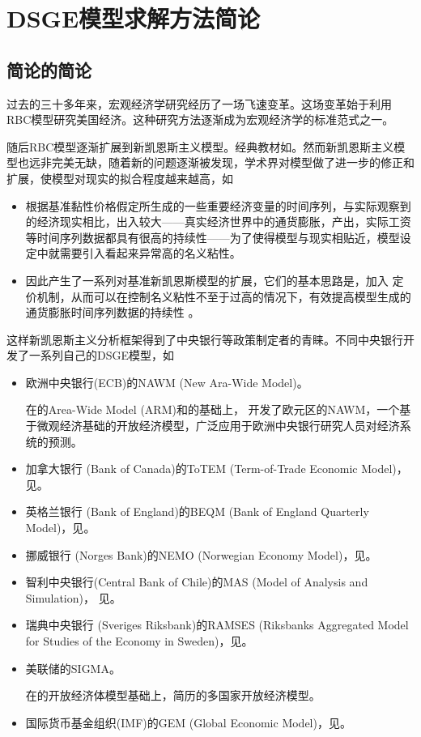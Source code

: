 \chapter{DSGE模型求解方法简论}
\label{sec:solution-strat}


\section{简论的简论}
过去的三十多年来，宏观经济学研究经历了一场飞速变革。这场变革始于\cite{Kydland:1982cd}利用RBC模型研究美国经济。这种研究方法逐渐成为宏观经济学的标准范式之一\citep{An:2007cv, FernandezVillaverde:2010fq}。

随后RBC模型逐渐扩展到新凯恩斯主义模型。经典教材如\cite{Gali:2005gp,Woodford:2011ks}。然而新凯恩斯主义模型也远非完美无缺，随着新的问题逐渐被发现，学术界对模型做了进一步的修正和扩展，使模型对现实的拟合程度越来越高，如
\begin{itemize}
  \item 根据基准黏性价格假定所生成的一些重要经济变量的时间序列，与实际观察到的经济现实相比，出入较大——真实经济世界中的通货膨胀，产出，实际工资等时间序列数据都具有很高的持续性——为了使得模型与现实相贴近，模型设定中就需要引入看起来异常高的名义粘性。
  \item 因此产生了一系列对基准新凯恩斯模型的扩展，它们的基本思路是，加入\cite{Calvo:1983uq} 定价机制，从而可以在控制名义粘性不至于过高的情况下，有效提高模型生成的通货膨胀时间序列数据的持续性 \citep{Rabanal:2005ii}。
\end{itemize}

这样新凯恩斯主义分析框架得到了中央银行等政策制定者的青睐。不同中央银行开发了一系列自己的DSGE模型，如
\begin{itemize}
  \item 欧洲中央银行(ECB)的NAWM (New Ara-Wide Model)。

  在\cite{Fagan:2005hv}的Area-Wide Model (ARM)和\cite{Smets:2003ic}的基础上，\cite{Christoffel:2008vq} 开发了欧元区的NAWM，一个基于微观经济基础的开放经济模型，广泛应用于欧洲中央银行研究人员对经济系统的预测。
  \item 加拿大银行 (Bank of Canada)的ToTEM (Term-of-Trade Economic Model)，见\cite{Murchison:2006wc}。
  \item 英格兰银行 (Bank of England)的BEQM (Bank of England Quarterly Model)，见\cite{Harrison:2005tc}。
  \item 挪威银行 (Norges Bank)的NEMO (Norwegian Economy Model)，见\cite{Brubakk:2006vu}。
  \item 智利中央银行(Central Bank of Chile)的MAS (Model of Analysis and Simulation)， 见\cite{Medina:2007tz}。
  \item 瑞典中央银行 (Sveriges Riksbank)的RAMSES (Riksbanks Aggregated Model for Studies of the Economy in Sweden)，见\cite{Adolfson:2007bv,Adolfson:2008cs}。
  \item 美联储的SIGMA。

  在\cite{Obstfeld:1995jp}的开放经济体模型基础上，\cite{Erceg:2006tf}简历的多国家开放经济模型。
  \item 国际货币基金组织(IMF)的GEM (Global Economic Model)，见\cite{Bayoumi:2004vx}。
\end{itemize}

